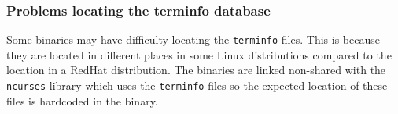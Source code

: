 \documentclass[twoside,11pt]{article}
\renewcommand{\_}{\texttt{\symbol{95}}}
\begin{document}




\subsubsection{Problems locating the terminfo database}

Some binaries may have difficulty locating the \texttt{terminfo} files.
This is because they are located in different places in some Linux
distributions compared to the location in a RedHat distribution.  The
binaries are linked non-shared with the \texttt{ncurses} library which
uses the \texttt{terminfo} files so the expected location of these files
is hardcoded in the binary.
\end{document}
